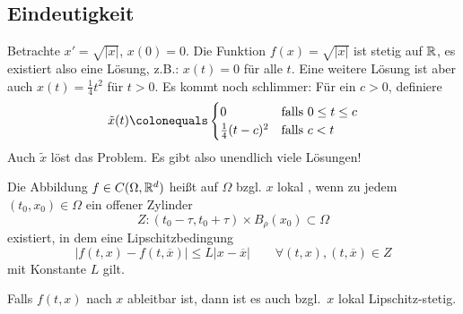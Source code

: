\subsection{Eindeutigkeit}

\begin{bsp}
	Betrachte $x' =\sqrt{\vert x \vert}$, $x(0)=0$. 
	Die Funktion $f(x)=\sqrt{\vert x \vert}$ ist stetig auf $\mathbb R$, es existiert also eine Lösung, z.B.: $x(t)=0$ für alle $t$. Eine weitere Lösung ist aber auch $x(t)=\frac{1}{4} t^2$ für $t>0$. Es kommt noch schlimmer:
	Für ein $c>0$, definiere
	\begin{equation*}
		\tilde{x}(t)\colonequals
		\begin{cases}
		0 & \text{falls}\ 0 \leq t \leq c \\
		\frac{1}{4} (t-c)^2 & \text{falls}\ c<t
			\end{cases}
	\end{equation*}
	Auch $\tilde{x}$ löst das Problem. Es gibt also unendlich viele Lösungen!
\end{bsp}

\begin{defi}
	Die Abbildung $f \in C(\Omega,\mathbb R^d)$ heißt auf $\Omega$ bzgl. $x$ lokal , wenn zu jedem $(t_0,x_0 ) \in \Omega$ ein offener Zylinder \begin{equation*}
		Z \colon (t_0-\tau,t_0+\tau ) \times B_{\rho} (x_0 ) \subset \Omega
	\end{equation*}
	existiert, in dem eine Lipschitzbedingung
	\begin{equation*}
	 \vert f(t,x)-f (t,\overline{x} ) \vert \leq L \vert x-\overline{x} \vert
	 \qquad
	 \forall (t,x),(t,\overline{x} ) \in Z
	\end{equation*}
	mit Konstante $L$ gilt.
\end{defi}

\begin{bem}
Falls $f(t,x)$ nach $x$ ableitbar ist, dann ist es auch bzgl.\ $x$ lokal Lipschitz-stetig.
\end{bem}

